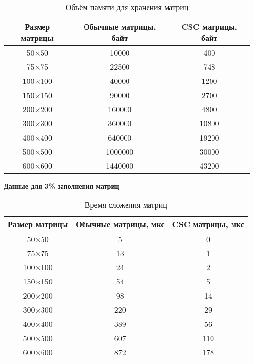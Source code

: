 \begin{table}[H]
	\centering
	\caption{Объём памяти для хранения матриц}
	\begin{tabular}{|c|c|c|}
		\hline
		Размер матрицы & Обычные матрицы, байт & CSC матрицы, байт \\ \hline
		50$\times$50         & 10000                 & 400              \\ \hline
		75$\times$75         & 22500                 & 748              \\ \hline
		100$\times$100        & 40000                 & 1200             \\ \hline
		150$\times$150        & 90000                 & 2700             \\ \hline
		200$\times$200        & 160000                & 4800             \\ \hline
		300$\times$300        & 360000                & 10800            \\ \hline
		400$\times$400        & 640000                & 19200            \\ \hline
		500$\times$500        & 1000000               & 30000            \\ \hline
		600$\times$600        & 1440000               & 43200            \\ \hline
	\end{tabular}
\end{table}

\newpage
\textbf{Данные для 3\% заполнения матриц}
\begin{table}[H]
	\centering
	\caption{Время сложения матриц}
	\begin{tabular}{|c|c|c|}
		\hline
		Размер матрицы & Обычные матрицы, мкс & CSC матрицы, мкс \\ \hline
		50$\times$50         & 5                    & 0                \\ \hline
		75$\times$75         & 13                   & 1                \\ \hline
		100$\times$100        & 24                   & 2                \\ \hline
		150$\times$150        & 54                   & 5                \\ \hline
		200$\times$200        & 98                   & 14               \\ \hline
		300$\times$300        & 220                  & 29               \\ \hline
		400$\times$400        & 389                  & 56               \\ \hline
		500$\times$500        & 607                  & 110              \\ \hline
		600$\times$600        & 872                  & 178              \\ \hline
	\end{tabular}
\end{table}


